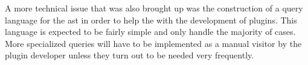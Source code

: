 \documentclass[a4paper,12pt,english]{article}
\begin{document}
	A more technical issue that was also brought up was the construction of a query language for the \ac{ast} in order to help the with the development of plugins. This language is expected to be fairly simple and only handle the majority of cases. More specialized queries will have to be implemented as a manual visitor by the plugin developer unless they turn out to be needed very frequently.
	
	
	

\end{document}

